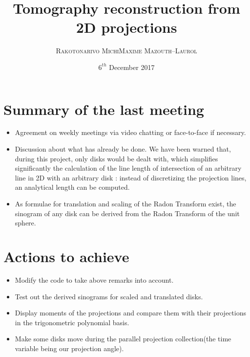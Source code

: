 \documentclass[a4,12pt]{article}
\title{\textbf{Tomography reconstruction from 2D projections}}
\author{
\begin{tabular}{cc}
	\textsc{Rakotonarivo Michi} & \textsc{Maxime Mazouth--Laurol}
\end{tabular}}
\date{\small $6^{th}$ December 2017}
\begin{document}
\maketitle

\section{Summary of the last meeting}
\begin{itemize}
\item Agreement on weekly meetings via video chatting or face-to-face if necessary.
\item Discussion about what has already be done. We have been warned that, during this project, only disks would be dealt with, which simplifies significantly the calculation of the line length of intersection of an arbitrary line in 2D with an arbitrary disk : instead of discretizing the projection lines, an analytical length can be computed.
\item As formulae for translation and scaling of the Radon Transform exist, the sinogram of any disk can be derived from the Radon Transform of the unit sphere.
\end{itemize}

\section{Actions to achieve}
\begin{itemize}
\item Modify the code to take above remarks into account.
\item Test out the derived sinograms for scaled and translated disks.
\item Display moments of the projections and compare them with their projections in the trigonometric polynomial basis.
\item Make some disks move during the parallel projection collection(the time variable being our projection angle).
\end{itemize}
\end{document}
